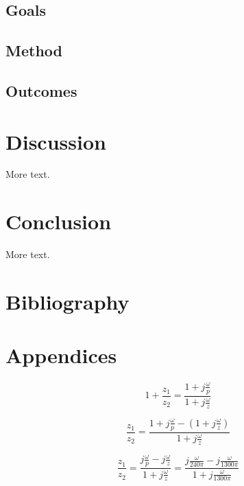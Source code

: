 \documentclass[12pt]{article} %
\begin{document}
\subsection{Goals}


\subsection{Method}


\subsection{Outcomes}
\pagebreak





\section{Discussion}
More text.
\pagebreak





\section{Conclusion}
More text.
\pagebreak




\section{Bibliography}


\pagebreak





\section{Appendices}

\begin{equation}
	1 + \frac{z_1}{z_2} = \frac{1+j\frac{\omega}{p}}{1+j\frac{\omega}{z}}
\end{equation}

\begin{equation}
	\frac{z_1}{z_2} = \frac{1+j\frac{\omega}{p}-(1+j\frac{\omega}{z})}{1+j\frac{\omega}{z}}
\end{equation}

\begin{equation}
	\frac{z_1}{z_2} = \frac{j\frac{\omega}{p}-j\frac{\omega}{z}}{1+j\frac{\omega}{z}} = \frac{j\frac{\omega}{240\pi}-j\frac{\omega}{1300\pi}}{1+j\frac{\omega}{1300\pi}} 
\end{equation}
\end{document}
